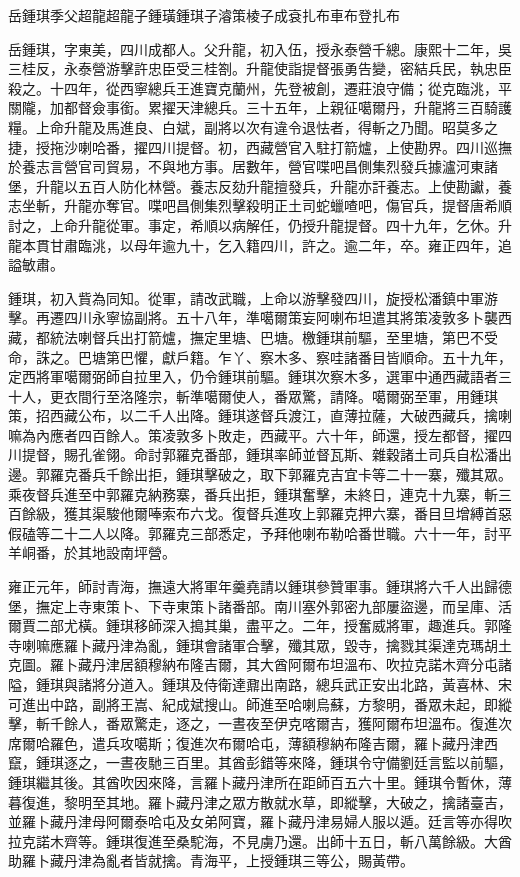 
\begin{pinyinscope}
岳鍾琪季父超龍超龍子鍾璜鍾琪子濬策棱子成袞扎布車布登扎布

岳鍾琪，字東美，四川成都人。父升龍，初入伍，授永泰營千總。康熙十二年，吳三桂反，永泰營游擊許忠臣受三桂劄。升龍使詣提督張勇告變，密結兵民，執忠臣殺之。十四年，從西寧總兵王進寶克蘭州，先登被創，遷莊浪守備；從克臨洮，平關隴，加都督僉事銜。累擢天津總兵。三十五年，上親征噶爾丹，升龍將三百騎護糧。上命升龍及馬進良、白斌，副將以次有違令退怯者，得斬之乃聞。昭莫多之捷，授拖沙喇哈番，擢四川提督。初，西藏營官入駐打箭爐，上使勘界。四川巡撫於養志言營官司貿易，不與地方事。居數年，營官喋吧昌側集烈發兵據瀘河東諸堡，升龍以五百人防化林營。養志反劾升龍擅發兵，升龍亦訐養志。上使勘讞，養志坐斬，升龍亦奪官。喋吧昌側集烈擊殺明正土司蛇蠟喳吧，傷官兵，提督唐希順討之，上命升龍從軍。事定，希順以病解任，仍授升龍提督。四十九年，乞休。升龍本貫甘肅臨洮，以母年逾九十，乞入籍四川，許之。逾二年，卒。雍正四年，追謚敏肅。

鍾琪，初入貲為同知。從軍，請改武職，上命以游擊發四川，旋授松潘鎮中軍游擊。再遷四川永寧協副將。五十八年，準噶爾策妄阿喇布坦遣其將策凌敦多卜襲西藏，都統法喇督兵出打箭爐，撫定里塘、巴塘。檄鍾琪前驅，至里塘，第巴不受命，誅之。巴塘第巴懼，獻戶籍。乍丫、察木多、察哇諸番目皆順命。五十九年，定西將軍噶爾弼師自拉里入，仍令鍾琪前驅。鍾琪次察木多，選軍中通西藏語者三十人，更衣間行至洛隆宗，斬準噶爾使人，番眾驚，請降。噶爾弼至軍，用鍾琪策，招西藏公布，以二千人出降。鍾琪遂督兵渡江，直薄拉薩，大破西藏兵，擒喇嘛為內應者四百餘人。策凌敦多卜敗走，西藏平。六十年，師還，授左都督，擢四川提督，賜孔雀翎。命討郭羅克番部，鍾琪率師並督瓦斯、雜穀諸土司兵自松潘出邊。郭羅克番兵千餘出拒，鍾琪擊破之，取下郭羅克吉宜卡等二十一寨，殲其眾。乘夜督兵進至中郭羅克納務寨，番兵出拒，鍾琪奮擊，未終日，連克十九寨，斬三百餘級，獲其渠駿他爾唪索布六戈。復督兵進攻上郭羅克押六寨，番目旦增縛首惡假磕等二十二人以降。郭羅克三部悉定，予拜他喇布勒哈番世職。六十一年，討平羊峒番，於其地設南坪營。

雍正元年，師討青海，撫遠大將軍年羹堯請以鍾琪參贊軍事。鍾琪將六千人出歸德堡，撫定上寺東策卜、下寺東策卜諸番部。南川塞外郭密九部屢盜邊，而呈庫、活爾賈二部尤橫。鍾琪移師深入搗其巢，盡平之。二年，授奮威將軍，趣進兵。郭隆寺喇嘛應羅卜藏丹津為亂，鍾琪會諸軍合擊，殲其眾，毀寺，擒戮其渠達克瑪胡土克圖。羅卜藏丹津居額穆納布隆吉爾，其大酋阿爾布坦溫布、吹拉克諾木齊分屯諸隘，鍾琪與諸將分道入。鍾琪及侍衛達鼐出南路，總兵武正安出北路，黃喜林、宋可進出中路，副將王嵩、紀成斌搜山。師進至哈喇烏蘇，方黎明，番眾未起，即縱擊，斬千餘人，番眾驚走，逐之，一晝夜至伊克喀爾吉，獲阿爾布坦溫布。復進次席爾哈羅色，遣兵攻噶斯；復進次布爾哈屯，薄額穆納布隆吉爾，羅卜藏丹津西竄，鍾琪逐之，一晝夜馳三百里。其酋彭錯等來降，鍾琪令守備劉廷言監以前驅，鍾琪繼其後。其酋吹因來降，言羅卜藏丹津所在距師百五六十里。鍾琪令暫休，薄暮復進，黎明至其地。羅卜藏丹津之眾方散就水草，即縱擊，大破之，擒諸臺吉，並羅卜藏丹津母阿爾泰哈屯及女弟阿寶，羅卜藏丹津易婦人服以遁。廷言等亦得吹拉克諾木齊等。鍾琪復進至桑駝海，不見虜乃還。出師十五日，斬八萬餘級。大酋助羅卜藏丹津為亂者皆就擒。青海平，上授鍾琪三等公，賜黃帶。


\end{pinyinscope}
